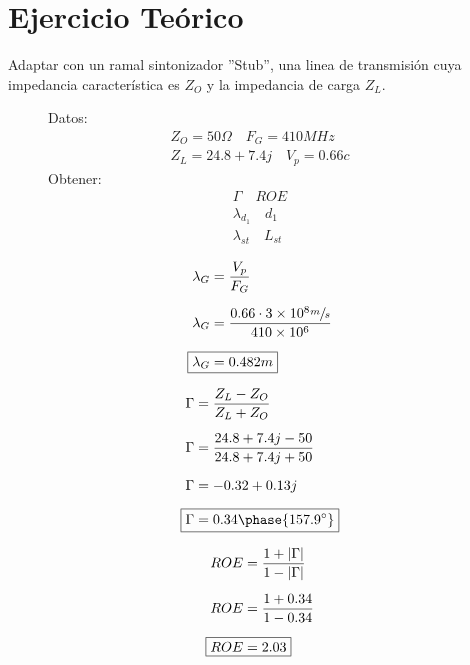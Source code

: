 \chapter{Ejercicio Teórico}
  Adaptar con un ramal sintonizador ''Stub'', una linea de transmisión cuya impedancia característica es $Z_O$ y la
  impedancia de carga $Z_L$.
  \begin{figure}[!ht]
    \centering
    \begin{minipage}{0.6\textwidth}
      \centering
      
    \end{minipage}
    \hfill
    \begin{minipage}{0.35\textwidth}
      Datos:
      \begin{gather*}
        Z_O = 50 \Omega \quad  F_G = 410MHz \\
        Z_L = 24.8 + 7.4 j \quad V_p = 0.66 c
      \end{gather*}
      Obtener:
      \begin{gather*}
        \Gamma \quad ROE \\
        \lambda_{d_1} \quad d_1 \\
        \lambda_{st} \quad L_{st}
      \end{gather*}
    \end{minipage}
  \end{figure}

  \begin{figure}[!ht]
    \centering
    \begin{minipage}[t]{0.3\textwidth}
      \begin{align*}
        \lambda_G &= \frac{V_p}{F_G} \\[6pt]
        \lambda_G &= \frac{0.66 \cdot 3 \times 10^8 \sfrac{m}{s}}{410 \times 10^6} \\[6pt]
        \Aboxed{\lambda_G &= 0.482m}
      \end{align*}
    \end{minipage}
    \hfill
    \begin{minipage}[t]{0.3\textwidth}
      \begin{align*}
        \Gamma &= \frac{Z_L - Z_O}{Z_L + Z_O} \\[6pt]
        \Gamma &= \frac{24.8 + 7.4 j - 50}{24.8 + 7.4 j + 50} \\[6pt]
        \Gamma &= -0.32 + 0.13j \\[6pt]
        \Aboxed{\Gamma &= 0.34 \phase{157.9^\circ}}
      \end{align*}
    \end{minipage}
    \hfill
    \begin{minipage}[t]{0.3\textwidth}
      \begin{align*}
        ROE &= \frac{1 + \left| \Gamma \right|}{1 - \left| \Gamma \right|} \\[6pt]
        ROE &= \frac{1 + 0.34}{1 - 0.34} \\[6pt]
        \Aboxed{ROE &= 2.03}
      \end{align*}
    \end{minipage}
  \end{figure}

